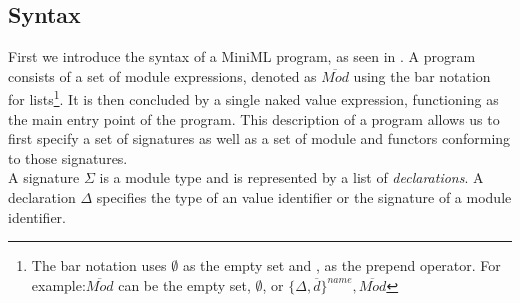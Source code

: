 \documentclass[10pt,a4paper,master=cws, masteroption=ai,english,inputenc=utf8]{kulemt}
\begin{document}
\subsection{Syntax}
\newcommand{\longspace}{\;\;\;\;\;\;}
\newcommand{\inlinecode}{\texttt}
First we introduce the syntax of a \mbox{MiniML} program, as seen in . A program consists of a set of module expressions, denoted as $\overline{\mathit{Mod}}$ using the bar notation for lists\footnote{The bar notation uses $\emptyset$ as the empty set and , as the prepend operator. For example:$\overline{\mathit{Mod}}$ can be the empty set, $\emptyset$, or $\lbrace \Delta, \overline{\mathit{d}}\rbrace^{name}, \overline{Mod}$}. It is then concluded by a single naked value expression, functioning as the main entry point of the program.
This description of a program allows us to first specify a set of signatures as well as a set of module and functors conforming to those signatures.
\\[2ex]
A signature $\Sigma$ is a module type and is represented by a list of \emph{declarations}. A declaration $\Delta$ specifies the type of an value identifier or the signature of a module identifier.
\end{document}

